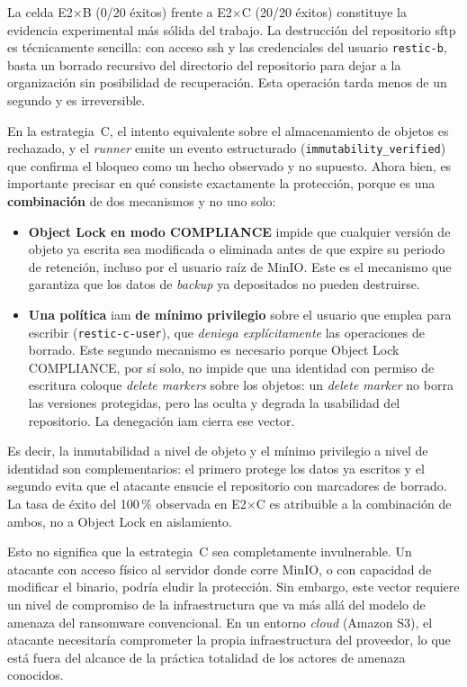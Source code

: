 \documentclass[../main.tex]{subfiles}
\begin{document}
La celda E2$\times$B (0/20 éxitos) frente a E2$\times$C (20/20 éxitos) constituye
la evidencia experimental más sólida del trabajo. La destrucción del repositorio
\gls{sftp} es técnicamente sencilla: con acceso \gls{ssh} y las credenciales del
usuario \texttt{restic-b}, basta un borrado recursivo del directorio del
repositorio para dejar a la organización sin posibilidad de recuperación. Esta
operación tarda menos de un segundo y es irreversible.

En la estrategia~C, el intento equivalente sobre el almacenamiento de objetos es
rechazado, y el \emph{runner} emite un evento estructurado
(\mbox{\texttt{immutability\_verified}}) que confirma el bloqueo como un hecho
observado y no supuesto. Ahora bien, es importante precisar en qué consiste
exactamente la protección, porque es una \textbf{combinación} de dos mecanismos y
no uno solo:

\begin{itemize}
  \item \textbf{Object Lock en modo COMPLIANCE} impide que cualquier versión de
  objeto ya escrita sea modificada o eliminada antes de que expire su periodo de
  retención, incluso por el usuario raíz de MinIO. Este es el mecanismo que
  garantiza que los datos de \emph{backup} ya depositados no pueden destruirse.

  \item \textbf{Una política} \gls{iam} \textbf{de mínimo privilegio} sobre el
  usuario que \restic emplea para escribir (\texttt{restic-c-user}), que
  \emph{deniega explícitamente} las operaciones de borrado. Este segundo mecanismo
  es necesario porque Object Lock COMPLIANCE, por sí solo, no impide que una
  identidad con permiso de escritura coloque \emph{delete markers} sobre los
  objetos: un \emph{delete marker} no borra las versiones protegidas, pero las
  oculta y degrada la usabilidad del repositorio. La denegación \gls{iam} cierra
  ese vector.
\end{itemize}

Es decir, la inmutabilidad a nivel de objeto y el mínimo privilegio a nivel de
identidad son complementarios: el primero protege los datos ya escritos y el
segundo evita que el atacante ensucie el repositorio con marcadores de borrado. La
tasa de éxito del 100\,\% observada en E2$\times$C es atribuible a la combinación de
ambos, no a Object Lock en aislamiento.

Esto no significa que la estrategia~C sea completamente invulnerable. Un atacante
con acceso físico al servidor donde corre MinIO, o con capacidad de modificar el
binario, podría eludir la protección. Sin embargo, este vector requiere un nivel
de compromiso de la infraestructura que va más allá del modelo de amenaza del
ransomware convencional. En un entorno \emph{cloud} (Amazon S3), el atacante
necesitaría comprometer la propia infraestructura del proveedor, lo que está fuera
del alcance de la práctica totalidad de los actores de amenaza conocidos.
\end{document}
